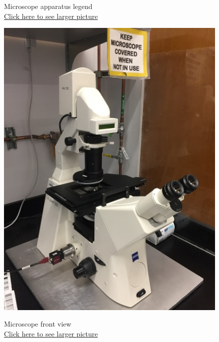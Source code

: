 \documentclass{../lab}
\begin{document}
\begin{figure}[!h]
  \caption{Microscope apparatus legend \\
  \href{http://experimentationlab.berkeley.edu/sites/default/files/upimages/2_Legend-Microscope_2540.JPG}{Click here to see larger picture}}
  \label{fig:MicroscopeLegend}
\endminipage\hfill
{}
  \href{http://experimentationlab.berkeley.edu/sites/default/files/upimages/1_Microscope_2539.JPG}{\includegraphics[width=\linewidth,keepaspectratio]{images/1_Microscope_2539.JPG}}
  \caption{Microscope front view\\ \href{http://experimentationlab.berkeley.edu/sites/default/files/upimages/1_Microscope_2539.JPG}{Click here to see larger picture}}\label{fig:Microscope}
\endminipage
\end{figure}
\end{document}
